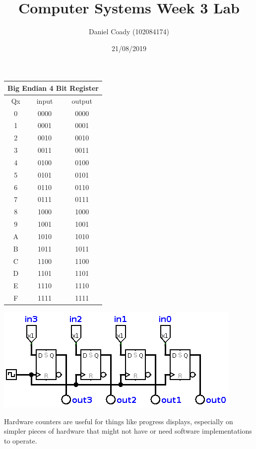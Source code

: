 \documentclass[11pt]{scrartcl}
\title{Computer Systems Week 3 Lab}
\author{Daniel Coady (102084174)}
\date{21/08/2019}
\begin{document}
\maketitle

\begin{center}
    \begin{tabular}{c|c c}
        \multicolumn{3}{c}{Big Endian 4 Bit Register} \\[1em]
        \hline
        Qx & input & output \\
        \hline
        0 & 0000 & 0000 \\
        1 & 0001 & 0001 \\
        2 & 0010 & 0010 \\
        3 & 0011 & 0011 \\
        4 & 0100 & 0100 \\
        5 & 0101 & 0101 \\
        6 & 0110 & 0110 \\
        7 & 0111 & 0111 \\
        8 & 1000 & 1000 \\
        9 & 1001 & 1001 \\
        A & 1010 & 1010 \\
        B & 1011 & 1011 \\
        C & 1100 & 1100 \\
        D & 1101 & 1101 \\
        E & 1110 & 1110 \\
        F & 1111 & 1111 \\
    \end{tabular}

    \includegraphics[scale=0.5]{images/bigendian4bitregister.png}
\end{center}

Hardware counters are useful for things like progress displays, especially
on simpler pieces of hardware that might not have or need software implementations
to operate.
\end{document}
